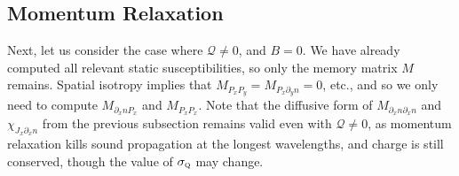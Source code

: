 \documentclass[10pt, oneside]{book}
\begin{document}
\begin{doublespace}
\subsection{Momentum Relaxation}

Next, let us consider the case where $\mathcal{Q}\ne 0$, and $B=0$.    We have already computed all relevant static susceptibilities, so only the memory matrix $M$ remains.   Spatial isotropy implies that $M_{P_xP_y} = M_{P_x\partial_y n} = 0$, etc., and so we only need to compute $M_{\partial_x n P_x}$ and $M_{P_xP_x}$.      Note that the diffusive form of $M_{\partial_x n \partial_x n}$ and $\chi_{J_x\partial_xn}$ from the previous subsection remains valid even with $\mathcal{Q}\ne 0$, as momentum relaxation kills sound propagation at the longest wavelengths, and charge is still conserved, though the value of $\sigma_{\textsc{q}}$ may change.


\end{doublespace}
\end{document}
